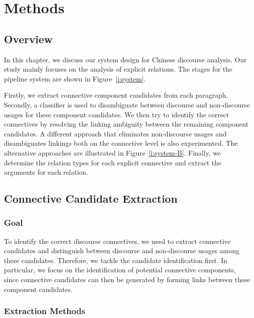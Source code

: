 %
%
%
\chapter{Methods}
\label{c:method}

\section{Overview}

In this chapter, we discuss our system design for Chinese discourse analysis.
Our study mainly focuses on the analysis of explicit relations.
The stages for the pipeline system are shown in Figure~\ref{i:system}.



Firstly, we extract connective component candidates from each paragraph.
Secondly, a classifier is used to disambiguate between discourse and
non-discourse usages for these component candidates. We then try to identify
the correct connectives by resolving the linking ambiguity between the remaining
component candidates.
A different approach that eliminates non-discourse usages and disambiguates
linkings both on the connective level is also experimented. The alternative
approaches are illustrated in Figure~\ref{i:system-B}.
Finally, we determine the relation types for each explicit
connective and extract the arguments for each relation.




\section{Connective Candidate Extraction}

\subsection{Goal}

To identify the correct discourse connectives, we need to
extract connective candidates and distinguish between discourse
and non-discourse usages among these candidates. Therefore, we tackle the
candidate identification first. In particular, we focus on the identification
of potential connective components, since connective candidates can then be
generated by forming links between these component candidates.

\subsection{Extraction Methods}

